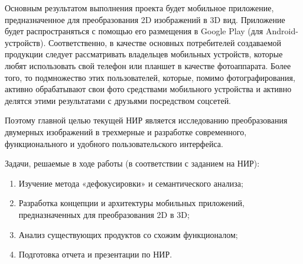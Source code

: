 
Основным результатом выполнения проекта будет мобильное приложение, предназначенное для преобразования 2D изображений в 3D вид. Приложение будет распространяться с помощью его размещения в Google Play (для Android-устройств). Соответственно, в качестве основных потребителей создаваемой продукции следует рассматривать владельцев мобильных устройств, которые любят использовать свой телефон или планшет в качестве фотоаппарата. Более того, то подмножество этих пользователей, которые, помимо фотографирования, активно обрабатывают свои фото средствами мобильного устройства и активно делятся этими результатами с друзьями посредством соцсетей.

Поэтому главной целью текущей НИР является исследованию	преобразования двумерных изображений в трехмерные и разработке современного, функционального и удобного пользовательского интерфейса. 

Задачи, решаемые в ходе работы (в соответствии с заданием на НИР):
\begin{enumerate}
    \item Изучение метода «дефокусировки» и семантического анализа;
    \item Разработка концепции и архитектуры мобильных приложений, предназначенных для преобразования 2D в 3D;
    \item Анализ существующих продуктов со схожим функционалом;
    \item Подготовка отчета и презентации по НИР.
\end{enumerate}
